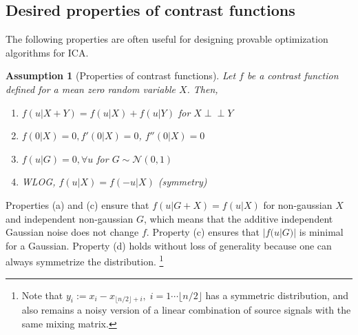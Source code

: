 \documentclass[letterpaper]{article}
\newtheorem{assumption}{Assumption}
\newcommand{\bb}[1]{\left(#1\right)}
\newcommand{\indep}{\perp \!\!\! \perp}
\begin{document}
\subsection{Desired properties of contrast functions}
\label{subsection:properties_contrast}
The following properties are often useful for designing provable optimization algorithms for ICA.
\begin{assumption}[Properties of contrast functions]\label{assump:third}
    Let $f$ be a contrast function defined for a mean zero random variable $X$. Then, 
    \begin{enumerate}[leftmargin=20pt,align=left,labelwidth=\parindent,labelsep=2pt]
    \vspace{-5pt}
      \itemsep0em 
      \item[(a)] $f(u|X+Y)=f(u|X)+f(u|Y)$ for $X \indep Y$ 
        \item[(b)]  $f(0|X)=0, f'(0|X)=0$, $f''(0|X)=0$
        \item[(c)]  $f(u|G)=0,\forall u$ for $G\sim\mathcal{N}\bb{0,1}$
        \item[(d)] WLOG, $f(u|X)=f(-u|X)$ (symmetry)
    \end{enumerate}
\end{assumption}
Properties (a) and (c) ensure that $f(u|G+X)=f(u|X)$ for non-gaussian $X$ and independent non-gaussian $G$, which means that the additive independent Gaussian noise does not change $f$. Property (c) ensures that $|f(u|G)|$ is minimal for a Gaussian.  Property (d) holds without loss of generality because one can always  symmetrize the distribution.
\footnote{Note that $y_i := x_i-x_{\lfloor n/2 \rfloor +i}, \; i = 1\cdots \lfloor n/2 \rfloor$ has a symmetric distribution, and also remains a noisy version of a linear combination of source signals with the same mixing matrix.}
\end{document}
